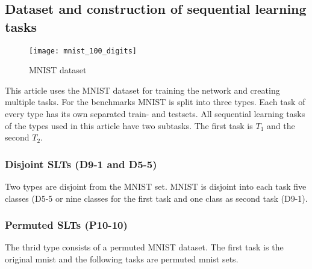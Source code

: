 \subsection*{Dataset and construction of sequential learning tasks}

\begin{figure}[H]
    \centering
    \texttt{[image: mnist\_100\_digits]}
    \caption{\cite{mnist_examples_image} MNIST dataset}
    \label{fig:intro_mnist_examples}
\end{figure}

This article uses the MNIST dataset for training the network and creating multiple tasks.
For the benchmarks MNIST is split into three types.
Each task of every type has its own separated train- and testsets.
All sequential learning tasks of the types used in this article have two subtasks.
The first task is $T_1$ and the second $T_2$.

\subsubsection*{Disjoint SLTs (D9-1 and D5-5)}

Two types are disjoint from the MNIST set.
MNIST is disjoint into each task five classes (D5-5 or nine classes for the first task and one class as second task (D9-1).

\subsubsection*{Permuted SLTs (P10-10)}

The thrid type consists of a permuted MNIST dataset.
The first task is the original mnist and the following tasks are permuted mnist sets.

\iffalse

- since the paper shows poorly benchmarks parameters this article sticks with the best suited network for the mnist dataset
- moreover is relies on the application-oriented study, where a batch size of 100 with 2500 iteration together with the two disjoint and on permuted type and two tasks where used.

\fi